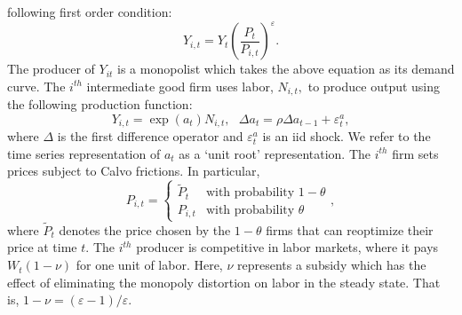 following first order condition:%
\[
Y_{i,t}=Y_{t}\left( \frac{P_{t}}{P_{i,t}}\right) ^{\varepsilon }. 
\]%
The producer of $Y_{it}$ is a monopolist which takes the above equation as
its demand curve. The $i^{th}$ intermediate good firm uses labor, $N_{i,t},$
to produce output using the following production function:%
\[
Y_{i,t}=\exp \left( a_{t}\right) N_{i,t},\text{ }\Delta a_{t}=\rho \Delta
a_{t-1}+\varepsilon _{t}^{a}, 
\]%
where $\Delta $ is the first difference operator and $\varepsilon _{t}^{a}$
is an iid shock. We refer to the time series representation of $a_{t}$ as a
`unit root' representation. The $i^{th}$ firm sets prices subject to Calvo
frictions. In particular,%
\[
P_{i,t}=\left\{ 
\begin{array}{cc}
\tilde{P}_{t} & \text{with probability }1-\theta \\ 
P_{i,t} & \text{with probability }\theta%
\end{array}%
\right. , 
\]%
where $\tilde{P}_{t}$ denotes the price chosen by the $1-\theta $ firms that
can reoptimize their price at time $t.$ The $i^{th}$ producer is competitive
in labor markets, where it pays $W_{t}\left( 1-\nu \right) $ for one unit of
labor. Here, $\nu $ represents a subsidy which has the effect of eliminating
the monopoly distortion on labor in the steady state. That is, $1-\nu
=\left( \varepsilon -1\right) /\varepsilon .$

